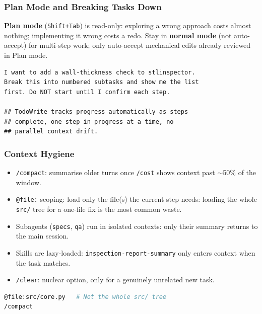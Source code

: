 \begin{frame}[fragile]\frametitle{Plan Mode and Breaking Tasks Down}
\textbf{Plan mode} (\texttt{Shift+Tab}) is read-only: exploring a wrong approach costs almost nothing; implementing it wrong costs a redo. Stay in \textbf{normal mode} (not auto-accept) for multi-step work; only auto-accept mechanical edits already reviewed in Plan mode.

\begin{lstlisting}
I want to add a wall-thickness check to stlinspector.
Break this into numbered subtasks and show me the list
first. Do NOT start until I confirm each step.

## TodoWrite tracks progress automatically as steps
## complete, one step in progress at a time, no
## parallel context drift.
\end{lstlisting}
\end{frame}


\begin{frame}[fragile]\frametitle{Context Hygiene}
  \begin{itemize}
    \item \texttt{/compact}: summarise older turns once \texttt{/cost} shows context past $\sim$50\% of the window.
    \item \texttt{@file:} scoping: load only the file(s) the current step needs: loading the whole \texttt{src/} tree for a one-file fix is the most common waste.
    \item Subagents (\texttt{specs}, \texttt{qa}) run in isolated contexts: only their summary returns to the main session.
    \item Skills are lazy-loaded: \texttt{inspection-report-summary} only enters context when the task matches.
    \item \texttt{/clear}: nuclear option, only for a genuinely unrelated new task.
  \end{itemize}
\begin{lstlisting}[language=bash]
@file:src/core.py   # Not the whole src/ tree
/compact
\end{lstlisting}
\end{frame}


